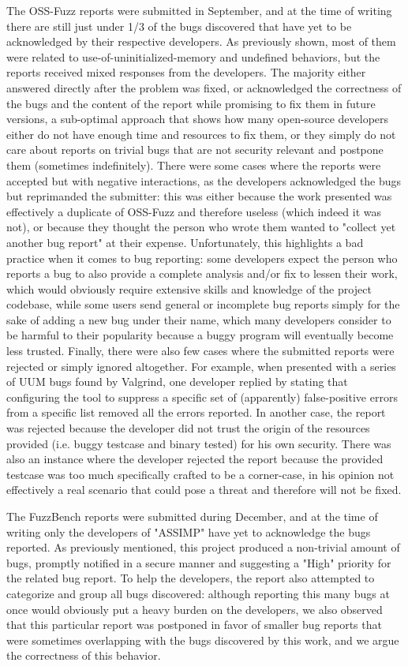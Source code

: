 The OSS-Fuzz reports were submitted in September, and at the time of writing there are still just under 1/3 of the bugs discovered that have yet to be acknowledged by their respective developers. 
As previously shown, most of them were related to use-of-uninitialized-memory and undefined behaviors, but the reports received mixed responses from the developers. The majority either answered directly after the problem was fixed, or acknowledged the correctness of the bugs and the content of the report while promising to fix them in future versions, a sub-optimal approach that shows how many open-source developers either do not have enough time and resources to fix them, or they simply do not care about reports on trivial bugs that are not security relevant and postpone them (sometimes indefinitely). 
There were some cases where the reports were accepted but with negative interactions, as the developers acknowledged the bugs but reprimanded the submitter: this was either because the work presented was effectively a duplicate of OSS-Fuzz and therefore useless (which indeed it was not), or because they thought the person who wrote them wanted to "collect yet another bug report" at their expense. Unfortunately, this highlights a bad practice when it comes to bug reporting: some developers expect the person who reports a bug to also provide a complete analysis and/or fix to lessen their work, which would obviously require extensive skills and knowledge of the project codebase, while some users send general or incomplete bug reports simply for the sake of adding a new bug under their name, which many developers consider to be harmful to their popularity because a buggy program will eventually become less trusted.
Finally, there were also few cases where the submitted reports were rejected or simply ignored altogether. For example, when presented with a series of UUM bugs found by Valgrind, one developer replied by stating that configuring the tool to suppress a specific set of (apparently) false-positive errors from a specific list removed all the errors reported. In another case, the report was rejected because the developer did not trust the origin of the resources provided (i.e. buggy testcase and binary tested) for his own security. There was also an instance where the developer rejected the report because the provided testcase was too much specifically crafted to be a corner-case, in his opinion not effectively a real scenario that could pose a threat and therefore will not be fixed.  

The FuzzBench reports were submitted during December, and at the time of writing only the developers of "ASSIMP" have yet to acknowledge the bugs reported. As previously mentioned, this project produced a non-trivial amount of bugs, promptly notified in a secure manner and suggesting a "High" priority for the related bug report. To help the developers, the report also attempted to categorize and group all bugs discovered: although reporting this many bugs at once would obviously put a heavy burden on the developers, we also observed that this particular report was postponed in favor of smaller bug reports that were sometimes overlapping with the bugs discovered by this work, and we argue the correctness of this behavior.     


